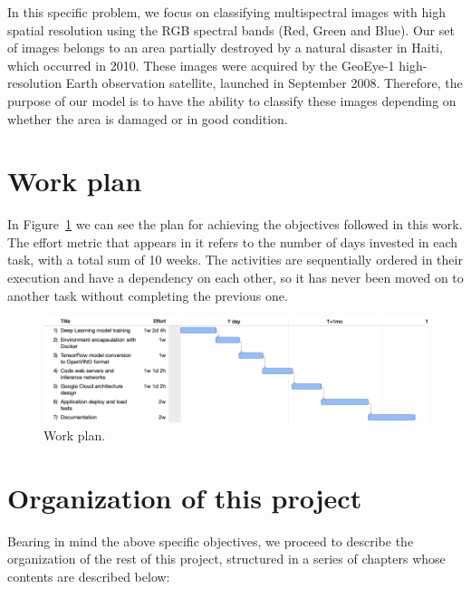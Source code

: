 In this specific problem, we focus on classifying multispectral images \cite{imageProcessing} with high spatial resolution using the RGB spectral bands (Red, Green and Blue).
Our set of images belongs to an area partially destroyed by a natural disaster in Haiti, which occurred in 2010.
These images were acquired by the GeoEye-1 high-resolution Earth observation satellite, launched in September 2008.
Therefore, the purpose of our  model is to have the ability to classify these images depending on whether the area is damaged or in good condition.

\section{Work plan}\label{sec: work-plan}
In Figure~\ref{fig:Plan de trabajo} we can see the plan for achieving the objectives followed in this work.
The effort metric that appears in it refers to the number of days invested in each task, with a total sum of 10 weeks.
The activities are sequentially ordered in their execution and have a dependency on each other, so it has never been
moved on to another task without completing the previous one.



\begin{figure}[H]
    \centering
    \includegraphics[width=1\textwidth]{images/chapter1/work_plan_eng.png}
    \caption{Work plan.}
    \label{fig:Plan de trabajo}
\end{figure}

\section{Organization of this project}\label{sec:organización-de-esta-memoria}

Bearing in mind the above specific objectives, we proceed to describe the organization of the rest of this project, structured in a series of chapters whose contents are
described below:

